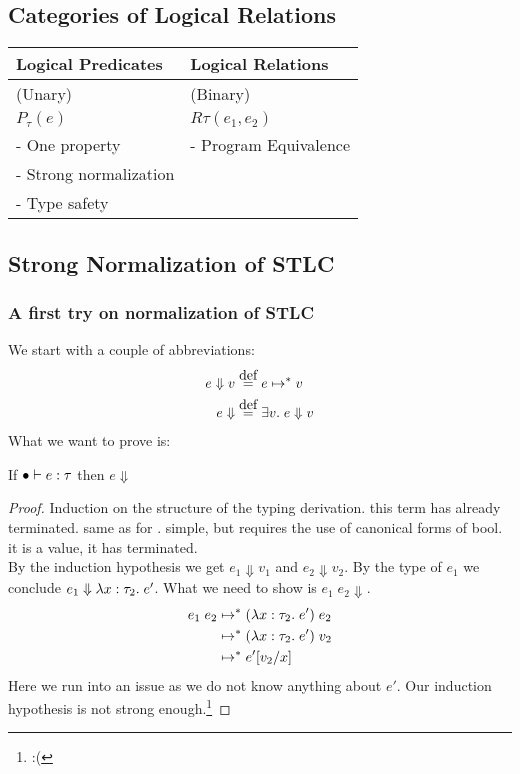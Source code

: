 \subsection*{Categories of Logical Relations}
\begin{tabular}{l | l}
  Logical Predicates     & Logical Relations    \\
\hline
  (Unary)                & (Binary)             \\
  $P_\tau(e)$             & $R\tau(e_1,e_2)$     \\
  - One property         & - Program Equivalence\\ %
  - Strong normalization & \\
  - Type safety          & \\
\end{tabular}
\subsection*{Strong Normalization of STLC}
\subsubsection*{A first try on normalization of STLC}
We start with a couple of abbreviations:
\begin{align*}
  e \Downarrow v & \eqdef e \evaltos v \\
  e \Downarrow   & \eqdef \exists v. \; e \Downarrow v
\end{align*}
What we want to prove is:
\begin{strnorm}
  If $\bullet \vdash e : \tau$ then $e \Downarrow$
\end{strnorm}
\begin{proof} 
Induction on the structure of the typing derivation.
 this term has already terminated.
 same as for \true.
 simple, but requires the use of canonical forms of bool.
 it is a value, it has terminated.
\case{$ \TApp $} \\
By the induction hypothesis we get $e_1 \Downarrow v_1$ and $e_2 \Downarrow v_2$. By the type of $e_1$ we conclude $e_1 \Downarrow \lambda x : \tau_2 . \; e'$. What we need to show is $e_1 \; e_2 \Downarrow$.
\begin{align*}
  e_1 \; e_2 & \mapsto^{*} (\lambda x : \tau_2 . \; e') \; e_2 \\
            & \mapsto^{*} (\lambda x : \tau_2 . \; e') \; v_2 \\
            & \mapsto^{*} e'[v_2/x]
\end{align*}
Here we run into an issue as we do not know anything about $e'$. Our induction hypothesis is not strong enough.\footnote{:(}
\end{proof}
